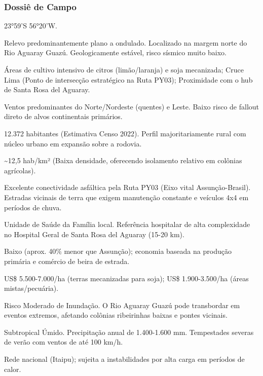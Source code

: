\subsubsection{Dossiê de Campo}
\begin{description}[style=nextline,leftmargin=0.5cm,font=\bfseries]
\item[Coordenadas]  23°59'S 56°20'W.
\item[Topografia]  Relevo predominantemente plano a ondulado. Localizado na margem norte do Rio Aguaray Guazú. Geologicamente estável, risco sísmico muito baixo.
\item[Alvos Estratégicos]  Áreas de cultivo intensivo de citros (limão/\allowbreak laranja) e soja mecanizada; Cruce Lima (Ponto de intersecção estratégico na Ruta PY03); Proximidade com o hub de Santa Rosa del Aguaray.
\item[Fallout]  Ventos predominantes do Norte/\allowbreak Nordeste (quentes) e Leste. Baixo risco de fallout direto de alvos continentais primários.
\item[População]  12.372 habitantes (Estimativa Censo 2022). Perfil majoritariamente rural com núcleo urbano em expansão sobre a rodovia.
\item[Densidade]  \textasciitilde 12,5 hab/\allowbreak km² (Baixa densidade, oferecendo isolamento relativo em colônias agrícolas).
\item[Vias de Acesso]  Excelente conectividade asfáltica pela Ruta PY03 (Eixo vital Assunção-Brasil). Estradas vicinais de terra que exigem manutenção constante e veículos 4x4 em períodos de chuva.
\item[Serviços]  Unidade de Saúde da Família local. Referência hospitalar de alta complexidade no Hospital Geral de Santa Rosa del Aguaray (15-20 km).
\item[Custo de Vida]  Baixo (aprox. 40\% menor que Assunção); economia baseada na produção primária e comércio de beira de estrada.
\item[Preço da Terra]  US\$ 5.500-7.000/\allowbreak ha (terras mecanizadas para soja); US\$ 1.900-3.500/\allowbreak ha (áreas mistas/\allowbreak pecuária).
\item[Hidrologia]  Risco Moderado de Inundação. O Rio Aguaray Guazú pode transbordar em eventos extremos, afetando colônias ribeirinhas baixas e pontes vicinais.
\item[Clima]  Subtropical Úmido. Precipitação anual de 1.400-1.600 mm. Tempestades severas de verão com ventos de até 100 km/\allowbreak h.
\item[Energia]  Rede nacional (Itaipu); sujeita a instabilidades por alta carga em períodos de calor.

\end{description}
